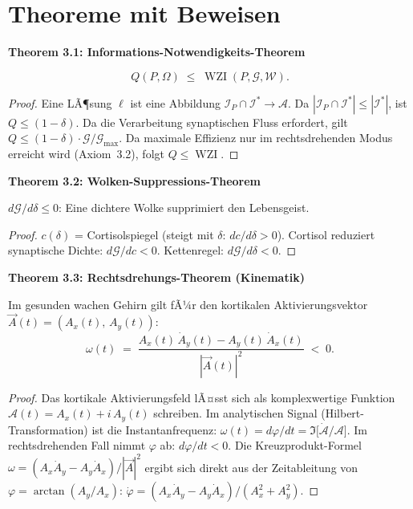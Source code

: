 ﻿\documentclass[12pt,a4paper]{report}
\theoremstyle{plain}
\theoremstyle{definition}
\theoremstyle{remark}
\DeclareMathOperator{\WZI}{WZI}
\begin{document}
	
	\section{Theoreme mit Beweisen}
	
	
	\noindent\textbf{Theorem 3.1: Informations-Notwendigkeits-Theorem}

		\[
		Q(P, \Omega) \;\leq\; \WZI(P, \mathcal{G}, \mathcal{W}).
		\]

	
	\begin{proof}
		Eine LÃ¶sung $\ell$ ist eine Abbildung $\mathcal{I}_P \cap \mathcal{I}^* \to \mathcal{A}$.
		Da $|\mathcal{I}_P \cap \mathcal{I}^*| \leq |\mathcal{I}^*|$, ist $Q \leq (1-\delta)$.
		Da die Verarbeitung synaptischen Fluss erfordert, gilt $Q \leq (1-\delta)\cdot\mathcal{G}/\mathcal{G}_{\max}$.
		Da maximale Effizienz nur im rechtsdrehenden Modus erreicht wird
		(Axiom~3.2), folgt $Q \leq \WZI$. 
	\end{proof}
	
	
	\noindent\textbf{Theorem 3.2: Wolken-Suppressions-Theorem}

		$d\mathcal{G}/d\delta \leq 0$:
		Eine dichtere Wolke supprimiert den Lebensgeist.

	
	\begin{proof}
		$c(\delta)$ = Cortisolspiegel (steigt mit $\delta$: $dc/d\delta > 0$).
		Cortisol reduziert synaptische Dichte: $d\mathcal{G}/dc < 0$.
		Kettenregel: $d\mathcal{G}/d\delta < 0$. 
	\end{proof}
	
	
	\noindent\textbf{Theorem 3.3: Rechtsdrehungs-Theorem (Kinematik)}

		\label{thm:rechts}
		Im gesunden wachen Gehirn gilt fÃ¼r den kortikalen Aktivierungsvektor
		$\vec{A}(t) = (A_x(t),\, A_y(t))$:
		\[
		\omega(t) \;=\;
		\frac{A_x(t)\,\dot{A}_y(t) - A_y(t)\,\dot{A}_x(t)}
		{|\vec{A}(t)|^2}
		\;<\; 0.
		\]

	
	\begin{proof}
		Das kortikale Aktivierungsfeld lÃ¤sst sich als komplexwertige Funktion
		$\mathcal{A}(t) = A_x(t) + i\,A_y(t)$ schreiben.
		Im analytischen Signal (Hilbert-Transformation) ist die Instantanfrequenz:
		$\omega(t) = d\varphi/dt = \Im\bigl[\dot{\mathcal{A}} / \mathcal{A}\bigr]$.
		Im rechtsdrehenden Fall nimmt $\varphi$ ab: $d\varphi/dt < 0$.
		Die Kreuzprodukt-Formel $\omega = (A_x\dot{A}_y - A_y\dot{A}_x)/|\vec{A}|^2$
		ergibt sich direkt aus der Zeitableitung von $\varphi = \arctan(A_y/A_x)$:
		$\dot{\varphi} = (A_x\dot{A}_y - A_y\dot{A}_x)/(A_x^2+A_y^2)$. 
	\end{proof}
	
\end{document}

